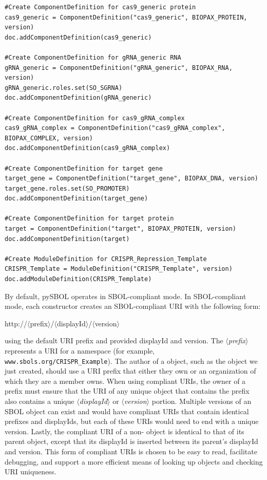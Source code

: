 \vspace{\abovedisplayskip}
\begin{minipage}{0.95\textwidth} 
\begin{lstlisting}
#Create ComponentDefinition for cas9_generic protein
cas9_generic = ComponentDefinition("cas9_generic", BIOPAX_PROTEIN, version)
doc.addComponentDefinition(cas9_generic)

#Create ComponentDefinition for gRNA_generic RNA
gRNA_generic = ComponentDefinition("gRNA_generic", BIOPAX_RNA, version)
gRNA_generic.roles.set(SO_SGRNA)
doc.addComponentDefinition(gRNA_generic)

#Create ComponentDefinition for cas9_gRNA_complex
cas9_gRNA_complex = ComponentDefinition("cas9_gRNA_complex", BIOPAX_COMPLEX, version)
doc.addComponentDefinition(cas9_gRNA_complex)

#Create ComponentDefinition for target gene
target_gene = ComponentDefinition("target_gene", BIOPAX_DNA, version)
target_gene.roles.set(SO_PROMOTER)
doc.addComponentDefinition(target_gene)

#Create ComponentDefinition for target protein
target = ComponentDefinition("target", BIOPAX_PROTEIN, version)
doc.addComponentDefinition(target)

#Create ModuleDefinition for CRISPR_Repression_Template
CRISPR_Template = ModuleDefinition("CRISPR_Template", version)
doc.addModuleDefinition(CRISPR_Template)
\end{lstlisting}
\end{minipage}

By default, pySBOL operates in SBOL-compliant mode. In SBOL-compliant mode, each constructor creates an SBOL-compliant URI with the following form:
\begin{center}
http://$\langle$prefix$\rangle$/$\langle$displayId$\rangle$/$\langle$version$\rangle$
\end{center}
using the default URI prefix and provided displayId and version. The \emph{$\langle$prefix$\rangle$} represents a URI for a namespace (for example, {\tt www.sbols.org/CRISPR\_Example}). The author of a  object, such as the  object we just created, should use a URI prefix that either they own or an organization of which they are a member owns. When using compliant URIs, the owner of a prefix must ensure that the URI of any unique  object that contains the prefix also contains a unique  \emph{$\langle$displayId$\rangle$} or \emph{$\langle$version$\rangle$} portion. Multiple versions of an SBOL object can exist and would have compliant URIs that contain identical prefixes and displayIds, but each of these URIs would need to end with a unique version. Lastly, the compliant URI of a non- object is identical to that of its parent object, except that its displayId is inserted between its parent's displayId and version. This form of compliant URIs is chosen to be easy to read, facilitate debugging, and support a more efficient means of looking up objects and checking URI uniqueness. 

